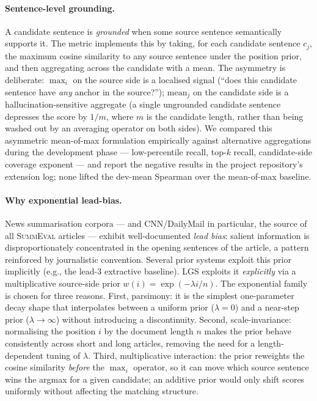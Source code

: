 \documentclass[journal]{IEEEtran}
\begin{document}
\paragraph{Sentence-level grounding.}
A candidate sentence is \emph{grounded} when some source sentence
semantically supports it. The metric implements this by taking,
for each candidate sentence $c_j$, the maximum cosine similarity
to any source sentence under the position prior, and then
aggregating across the candidate with a mean. The asymmetry is
deliberate: $\max_i$ on the source side is a localised signal
(``does this candidate sentence have \emph{any} anchor in the
source?''); $\mathrm{mean}_j$ on the candidate side is a
hallucination-sensitive aggregate (a single ungrounded
candidate sentence depresses the score by $1/m$, where $m$ is the
candidate length, rather than being washed out by an averaging
operator on both sides). We compared this asymmetric mean-of-max
formulation empirically against alternative aggregations during
the development phase --- low-percentile recall, top-$k$ recall,
candidate-side coverage exponent --- and report the negative
results in the project repository's extension log; none lifted
the dev-mean Spearman over the mean-of-max baseline.

\paragraph{Why exponential lead-bias.}
News summarisation corpora --- and CNN/DailyMail in
particular, the source of all \textsc{SummEval} articles ---
exhibit well-documented \emph{lead bias}: salient information is
disproportionately concentrated in the opening sentences of the
article, a pattern reinforced by journalistic convention. Several
prior systems exploit this prior implicitly (e.g., the lead-3
extractive baseline). LGS exploits it \emph{explicitly} via a
multiplicative source-side prior $w(i)=\exp(-\lambda i / n)$.
The exponential family is chosen for three reasons. First,
parsimony: it is the simplest one-parameter decay shape that
interpolates between a uniform prior ($\lambda{=}0$) and a
near-step prior ($\lambda \to \infty$) without introducing a
discontinuity. Second, scale-invariance: normalising the position
$i$ by the document length $n$ makes the prior behave
consistently across short and long articles, removing the need
for a length-dependent tuning of $\lambda$. Third, multiplicative
interaction: the prior reweights the cosine similarity \emph{before}
the $\max_i$ operator, so it can move which source sentence wins
the argmax for a given candidate; an additive prior would only
shift scores uniformly without affecting the matching structure.
\end{document}
